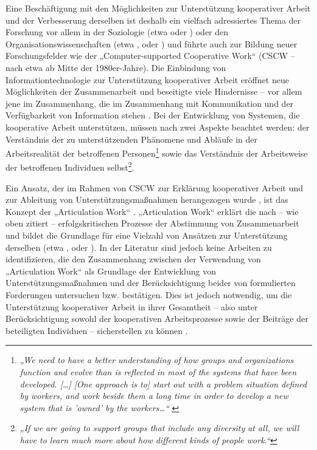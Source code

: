 Eine Beschäftigung mit den Möglichkeiten zur Unterstützung kooperativer Arbeit und der Verbesserung derselben ist deshalb ein vielfach adressiertes Thema der Forschung vor allem in der Soziologie (etwa \citet{Strauss93} oder \citet{Suchman95}) oder den Organisationswissenschaften (etwa \citet{Argyris78}, \citet{Kim93} oder \citet{Firestone03a}) und führte auch zur Bildung neuer Forschungsfelder wie der „Computer-supported Cooperative Work“ (CSCW -- nach \citet{Grudin94} etwa ab Mitte der 1980er-Jahre). Die Einbindung von Informationtechnologie zur Unterstützung kooperativer Arbeit eröffnet neue Möglichkeiten der Zusammenarbeit und beseitigte viele Hindernisse -- vor allem jene im Zusammenhang, die im Zusammenhang mit Kommunikation und der Verfügbarkeit von Information stehen \citep{Grudin88}. Bei der Entwicklung von Systemen, die kooperative Arbeit unterstützen, müssen nach \citet{Grudin88} zwei Aspekte beachtet werden: der Verständnis der zu unterstützenden Phänomene und Abläufe in der Arbeitsrealität der betroffenen Personen\footnote{\emph{„We need to have a better understanding of how groups and organizations function and evolve than is reflected in most of the systems that have been developed. [\ldots] [One approach is to] start out with a problem situation defined by workers, and work beside them a long time in order to develop a new system that is 'owned' by the workers\ldots“} \citep[][S.90]{Grudin88}} sowie das Verständnis der Arbeitsweise der betroffenen Individuen selbst\footnote{\emph{„If we are going to support groups that include any diversity at all, we will have to learn much more about how different kinds of people work.“}\citep[][S.91]{Grudin88}}. 

Ein Ansatz, der im Rahmen von CSCW zur Erklärung kooperativer Arbeit und zur Ableitung von Unterstützungsmaßnahmen herangezogen wurde \cite{Schmidt92}, ist das Konzept der „Articulation Work“ \citet{Strauss85}. „Articulation Work“ erklärt die nach \citet{Roy01} -- wie oben zitiert -- erfolgskritischen Prozesse der Abstimmung von Zusammenarbeit und bildet die Grundlage für eine Vielzahl von Ansätzen zur Unterstützung derselben (etwa \citep{Cabitza06}, \cite{Raposo04} oder \cite{Davenport02}). In der Literatur sind jedoch keine Arbeiten zu identifizieren, die den Zusammenhang zwischen der Verwendung von „Articulation Work“ als Grundlage der Entwicklung von Unterstützungsmaßnahmen und der Berücksichtigung beider von \citet{Grudin88} formulierten Forderungen untersuchen bzw. bestätigen. Dies ist jedoch notwendig, um die Unterstützung kooperativer Arbeit in ihrer Gesamtheit -- also unter Berücksichtigung sowohl der kooperativen Arbeitsprozesse sowie der Beiträge der beteiligten Individuen -- sicherstellen zu können \citep{Grudin88}.

